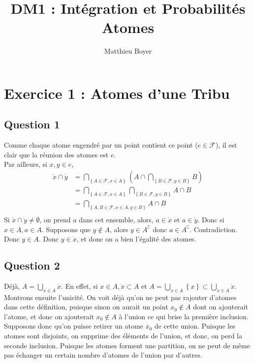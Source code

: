 \documentclass{cours}
\title{DM1 : Intégration et Probabilités \\ \small Atomes}
\author{Matthieu Boyer}
\begin{document}
    \section{Exercice 1 : Atomes d'une Tribu}
        \subsection{Question 1}
            Comme chaque atome engendré par un point contient ce point ($e \in \mathcal{F}$), il est clair que la réunion des atomes est $e$.\\
            Par ailleurs, si $x, y \in e$, 
            \[
                \begin{split}
                    \dot{x} \cap \dot{y} &= \bigcap_{\left\{A \in \mathcal{F}, x \in A\right\}} (A \cap \bigcap_{\left\{B \in \mathcal{F}, y \in B\right\}} B) \\
                    &= \bigcap_{\left\{A \in \mathcal{F}, x \in A\right\}} \bigcap_{\left\{B \in \mathcal{F}, y \in B\right\}} A\cap B \\
                    &= \bigcap_{\left\{A, B \in \mathcal{F}, x \in A, y \in B\right\}} A\cap B\\
                \end{split}
            \]
            Si $\dot{x} \cap \dot{y} \neq \emptyset$, on prend $a$ dans cet ensemble, alors, $a \in \dot{x}$ et $a \in \dot{y}$. Donc si $x \in A, a \in A$. Supposons que $y \notin A$, alors $y \in A^{\complement}$ donc $a \in A^{\complement}$. Contradiction. Donc $y \in A$. Donc $y \in \dot{x}$, et donc on a bien l'égalité des atomes. 

        \subsection{Question 2}
            Déjà, $A = \bigcup\limits_{x \in A} \dot{x}$. En effet, si $x \in A, \dot{x} \subset A$ et $A = \bigcup\limits_{x\in A} \left\{x\right\} \subset \bigcup\limits_{x \in A} \dot{x}$.
            Montrons ensuite l'unicité. On voit déjà qu'on ne peut pas rajouter d'atomes dans cette définition, puisque sinon on aurait un point $x_{0} \notin A$ dont on ajouterait l'atome, et donc on ajouterait $x_{0} \notin A$ à l'union ce qui brise la première inclusion. 
            Supposons donc qu'on puisse retirer un atome $\dot{x_{0}}$ de cette union. Puisque les atomes sont disjoints, on supprime des éléments de l'union, et donc, on perd la seconde inclusion. Puisque les atomes forment une partition, on ne peut de même pas échanger un certain nombre d'atomes de l'union par d'autres. 
\end{document}
